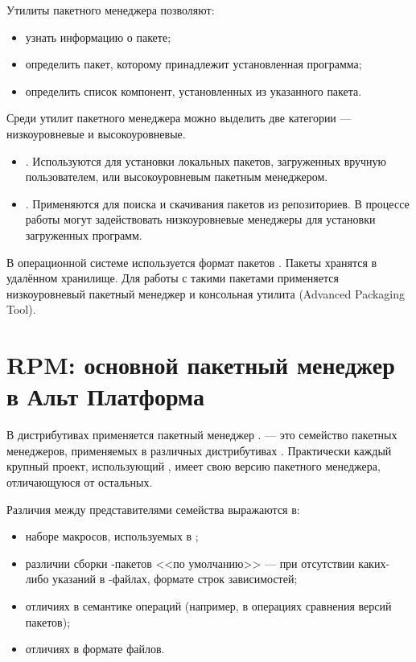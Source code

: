Утилиты пакетного менеджера позволяют:

\begin{itemize}
	\item узнать информацию о пакете;
	\item определить пакет, которому принадлежит установленная программа;
	\item определить список компонент, установленных из указанного пакета.
\end{itemize}

Среди утилит пакетного менеджера можно выделить две категории --- низкоуровневые и высокоуровневые.

\begin{itemize}
	\item {}. Используются для установки
		локальных пакетов, загруженных вручную пользователем, или высокоуровневым пакетным менеджером.
	\item {}. Применяются для поиска и скачивания пакетов из репозиториев.
		В процессе работы могут задействовать низкоуровневые менеджеры для установки загруженных программ.
\end{itemize}

В операционной системе  используется формат пакетов . 
Пакеты  хранятся в удалённом хранилище.
Для работы с такими пакетами применяется низкоуровневый пакетный менеджер  
и консольная утилита  (Advanced Packaging Tool). 


\section{RPM: основной пакетный менеджер в Альт Платформа}
В дистрибутивах  применяется пакетный менеджер .  --- 
это семейство пакетных менеджеров, применяемых в различных дистрибутивах . 
Практически каждый крупный проект, использующий , имеет свою версию пакетного менеджера, 
отличающуюся от остальных.

Различия между представителями семейства  выражаются в:

\begin{itemize}
	\item наборе макросов, используемых в ;
	\item различии сборки -пакетов <<по умолчанию>> --- при отсутствии каких-либо 
		указаний в -файлах, формате строк зависимостей;
	\item отличиях в семантике операций (например, в операциях сравнения версий пакетов);
	\item отличиях в формате файлов.
\end{itemize}

